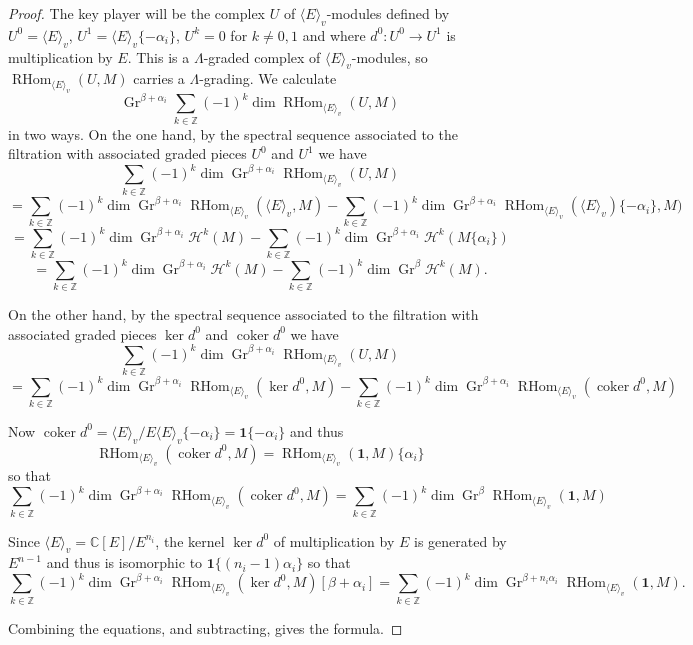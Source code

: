 \documentclass[11pt,letterpaper]{article}
\theoremstyle{definition}
\theoremstyle{remark}
\numberwithin{equation}{section}
\theoremstyle{dotless}
\newcommand{\Gr}{\operatorname{Gr}}
\newcommand{\qv}{v}
\newcommand \coker {\operatorname{coker}}
\begin{document}
\begin{proof} The key player will be the complex $U$ of $\langle E \rangle_{\qv}$-modules defined by $U^0 = \langle E \rangle_{\qv}$,  $U^1 = \langle E \rangle_{\qv}\{-\alpha_i\} $, $U^k = 0 $ for $k\neq 0,1$ and where $d^0 \colon U^0 \to U^1$ is multiplication by $E$. This is a $\Lambda$-graded complex of $\langle E \rangle_{\qv}$-modules, so  $\operatorname{RHom}_{\langle E \rangle_{\qv}} ( U, M) $ carries a $\Lambda$-grading. We calculate \[ \Gr^{\beta+\alpha_i}  \sum_{k \in \mathbb Z}(-1)^k  \dim \operatorname{RHom}_{\langle E \rangle_{\qv}} ( U, M) \]  in two ways. On the one hand, by the spectral sequence associated to the filtration with associated graded pieces $U^0$ and $U^1$ we have
\[  \sum_{k \in \mathbb Z}(-1)^k  \dim \Gr^{\beta+\alpha_i} \operatorname{RHom}_{\langle E \rangle_{\qv}} ( U, M)  \] \[=  \sum_{k \in \mathbb Z}(-1)^k  \dim \Gr^{\beta+\alpha_i}\operatorname{RHom}_{\langle E \rangle_{\qv}} (\langle E \rangle_{\qv} , M)  -  \sum_{k \in \mathbb Z}(-1)^k  \dim \Gr^{\beta+\alpha_i} \operatorname{RHom}_{\langle E \rangle_{\qv}} (\langle E \rangle_{\qv})\{-\alpha_i \}  , M)  \] \[= \sum_{k \in \mathbb Z} (-1)^k \dim  \Gr^{\beta+\alpha_i} \mathcal H^k (M)  - \sum_{k\in \mathbb Z} (-1)^k \dim  \Gr^{\beta+\alpha_i} \mathcal H^k (M \{\alpha_i\} )  \] \[= \sum_{k \in \mathbb Z} (-1)^k \dim \Gr^{\beta+\alpha_i} \mathcal H^k (M) - \sum_{k\in \mathbb Z} (-1)^k \dim \Gr^\beta \mathcal H^k (M) .\]

On the other hand, by the spectral sequence associated to the filtration with associated graded pieces $\ker d^0 $ and $\coker d^0  $ we have
\[  \sum_{k \in \mathbb Z}(-1)^k  \dim  \Gr^{\beta+\alpha_i} \operatorname{RHom}_{\langle E \rangle_{\qv}}  ( U, M)  \] \[ =  \sum_{k \in \mathbb Z}(-1)^k  \dim  \Gr^{\beta+\alpha_i}\operatorname{RHom}_{\langle E \rangle_{\qv}} (\ker d^0 , M)   -  \sum_{k \in \mathbb Z}(-1)^k  \dim  \Gr^{\beta+\alpha_i}\operatorname{RHom}_{\langle E \rangle_{\qv}} (\coker d^0   , M)   \]

Now $\coker d^0 =\langle E \rangle_{\qv}/ E \langle E \rangle_{\qv} \{ -\alpha_i\}  = \mathbf 1\{-\alpha_i\}$ and thus  \[ \operatorname{RHom}_{\langle E \rangle_{\qv}} (\coker d^0   , M)  =   \operatorname{RHom}_{ \langle E \rangle_{\qv}} ( \mathbf 1, M )\{\alpha_i\} \]  so that \[  \sum_{k \in \mathbb Z}(-1)^k  \dim  \Gr^{\beta+\alpha_i}\operatorname{RHom}_{\langle E \rangle_{\qv}} (\coker d^0   , M)   = \sum_{k\in \mathbb Z} (-1)^k  \dim  \Gr^\beta \operatorname{RHom}_{ \langle E \rangle_{\qv}} ( \mathbf 1, M ) \]

Since $\langle E\rangle_{\qv} = \mathbb C[E]/E^{n_i}$, the kernel $\ker d^0$ of multiplication by $E$ is generated by $E^{n-1}$ and thus is isomorphic to $\mathbf 1 \{ (n_i-1)\alpha_i\}$ so that
 \[  \sum_{k \in \mathbb Z}(-1)^k  \dim   \Gr^{\beta+\alpha_i} \operatorname{RHom}_{\langle E \rangle_{\qv}} (\ker d^0   , M) [\beta+\alpha_i]   = \sum_{k\in \mathbb Z} (-1)^k  \dim \Gr^{\beta+ n_i\alpha_i } \operatorname{RHom}_{ \langle E \rangle_{\qv}} ( \mathbf 1, M ) . \]

Combining the equations, and subtracting, gives the formula. \end{proof}
\end{document}
